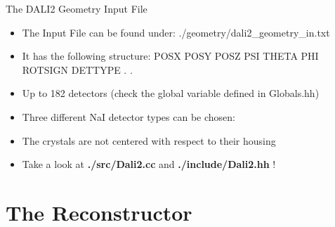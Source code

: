 \documentclass[
  style=pd,
  clock
]{powerdot}
\begin{document}
\begin{CJK}{UTF8}{min}
\begin{slide}{The DALI2 Geometry Input File}
  \begin{itemize}\itemsep 10pt
  \item The Input File can be found under: {\ttfamily ./geometry/dali2\_geometry\_in.txt}
  \item It has the following structure:\linebreak
    {\ttfamily POSX POSY POSZ PSI THETA PHI ROTSIGN DETTYPE\linebreak
      .\linebreak
      .
    }
  \item Up to 182 detectors (check the global variable defined in {\ttfamily Globals.hh})
  \item Three different NaI detector types can be chosen:
  \item The crystals are not centered with respect to their housing
  \item {Take a look at {\ttfamily \color{red} \bf  ./src/Dali2.cc} 
    and {\ttfamily \color{red} \bf./include/Dali2.hh} !}
  \end{itemize}
\end{slide}

\section[]{The Reconstructor}


\end{CJK}
\end{document}
